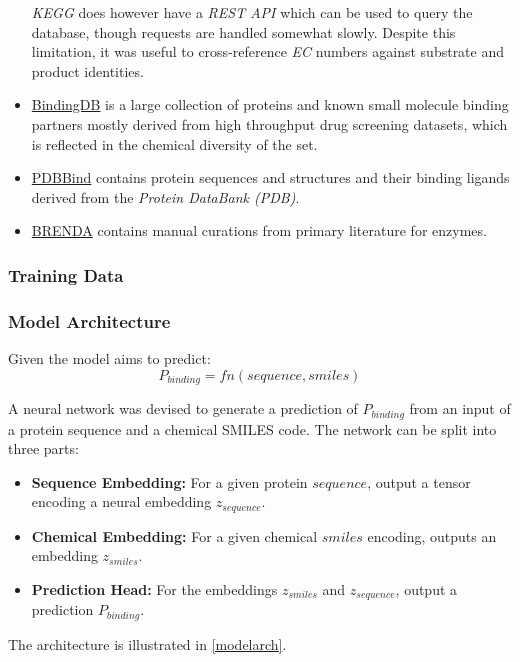 \documentclass{article}
\begin{document}
\begin{itemize}
		\textit{KEGG} does however have a \textit{REST API} which can be used to query the database, though requests are handled somewhat slowly.
		Despite this limitation, it was useful to cross-reference \textit{EC} numbers against substrate and product identities.
	\item \href{https://www.bindingdb.org/bind/index.jsp}{BindingDB} is a large collection of proteins and known small molecule binding partners mostly derived from high throughput drug screening datasets, which is reflected in the chemical diversity of the set.
	\item \href{http://pdbbind.org.cn/}{PDBBind} contains protein sequences and structures and their binding ligands derived from the \textit{Protein DataBank (PDB)}.
	\item \href{https://www.brenda-enzymes.org/}{BRENDA} contains manual curations from primary literature for enzymes.
\end{itemize}


\subsubsection{Training Data}

\subsubsection{Model Architecture}

Given the model aims to predict:
$$
P_{binding} = fn(sequence, smiles)
$$

A neural network was devised to generate a prediction of $P_{binding}$ from an input of a protein sequence and a chemical SMILES code.
The network can be split into three parts:

\begin{itemize}
	\item \textbf{Sequence Embedding:} For a given protein $sequence$, output a tensor encoding a neural embedding $z_{sequence}$.
	\item \textbf{Chemical Embedding:} For a given chemical $smiles$ encoding, outputs an embedding $z_{smiles}$.
	\item \textbf{Prediction Head:} For the embeddings $z_{smiles}$ and $z_{sequence}$, output a prediction $P_{binding}$.
\end{itemize}

The architecture is illustrated in \ref{modelarch}.
\end{document}
